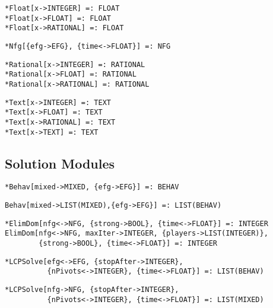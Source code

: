 \protect \large \begin{verbatim}
*Float[x->INTEGER] =: FLOAT
*Float[x->FLOAT] =: FLOAT
*Float[x->RATIONAL] =: FLOAT
\end{verbatim} \normalsize

\protect \large \begin{verbatim}
*Nfg[{efg->EFG}, {time<->FLOAT}] =: NFG
\end{verbatim}\normalsize

\protect \large \begin{verbatim}
*Rational[x->INTEGER] =: RATIONAL
*Rational[x->FLOAT] =: RATIONAL
*Rational[x->RATIONAL] =: RATIONAL
\end{verbatim} \normalsize

\protect \large \begin{verbatim}
*Text[x->INTEGER] =: TEXT
*Text[x->FLOAT] =: TEXT
*Text[x->RATIONAL] =: TEXT
*Text[x->TEXT] =: TEXT
\end{verbatim} \normalsize



\medskip
\subsection{Solution Modules}

\protect \large \begin{verbatim}
*Behav[mixed->MIXED, {efg->EFG}] =: BEHAV
\end{verbatim}\normalsize

\protect \large \begin{verbatim}
Behav[mixed->LIST(MIXED),{efg->EFG}] =: LIST(BEHAV)
\end{verbatim}\normalsize

\protect \large \begin{verbatim}
*ElimDom[nfg<->NFG, {strong->BOOL}, {time<->FLOAT}] =: INTEGER
ElimDom[nfg<->NFG, maxIter->INTEGER, {players->LIST(INTEGER)},
        {strong->BOOL}, {time<->FLOAT}] =: INTEGER
\end{verbatim} \normalsize

\protect \large \begin{verbatim}
*LCPSolve[efg<->EFG, {stopAfter->INTEGER},
          {nPivots<->INTEGER}, {time<->FLOAT}] =: LIST(BEHAV)
\end{verbatim}\normalsize

\protect \large \begin{verbatim}
*LCPSolve[nfg->NFG, {stopAfter->INTEGER},
          {nPivots<->INTEGER}, {time<->FLOAT}] =: LIST(MIXED)
\end{verbatim}\normalsize

